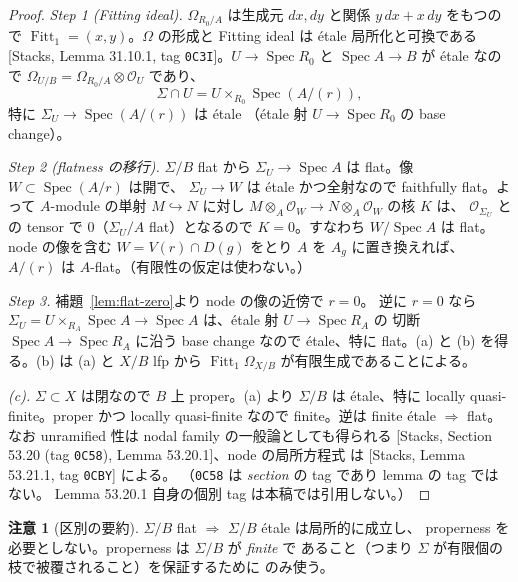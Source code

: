\documentclass[11pt,a4paper]{article}
\numberwithin{equation}{section}
\theoremstyle{definition}
\newtheorem{remark}[definition]{注意}
\DeclareMathOperator{\Fitt}{Fitt}
\newcommand{\OO}{\mathcal O}
\begin{document}
\begin{proof}
\emph{Step 1 (Fitting ideal).} \(\Omega_{R_0/A}\) は生成元 \(dx,dy\) と関係
\(y\,dx+x\,dy\) をもつので \(\Fitt_1=(x,y)\)。\(\Omega\) の形成と Fitting
ideal は étale 局所化と可換である
[Stacks, Lemma 31.10.1, tag \texttt{0C3I}]。\(U\to\operatorname{Spec}R_0\)
と \(\operatorname{Spec}A\to B\) が étale なので
\(\Omega_{U/B}=\Omega_{R_0/A}\otimes\OO_U\) であり、
\[
  \Sigma\cap U=U\times_{R_0}\operatorname{Spec}(A/(r)),
\]
特に \(\Sigma_U\to\operatorname{Spec}(A/(r))\) は étale
（étale 射 \(U\to\operatorname{Spec}R_0\) の base change）。

\emph{Step 2 (flatness の移行).} \(\Sigma/B\) flat から \(\Sigma_U\to
\operatorname{Spec}A\) は flat。像 \(W\subset\operatorname{Spec}(A/r)\) は開で、
\(\Sigma_U\to W\) は étale かつ全射なので faithfully flat。よって
\(A\)-module の単射 \(M\hookrightarrow N\) に対し
\(M\otimes_A\OO_W\to N\otimes_A\OO_W\) の核 \(K\) は、
\(\OO_{\Sigma_U}\) との tensor で \(0\)（\(\Sigma_U/A\) flat）となるので
\(K=0\)。すなわち \(W/\operatorname{Spec}A\) は flat。node の像を含む
\(W=V(r)\cap D(g)\) をとり \(A\) を \(A_g\) に置き換えれば、
\(A/(r)\) は \(A\)-flat。（有限性の仮定は使わない。）

\emph{Step 3.} 補題~\ref{lem:flat-zero}より node の像の近傍で \(r=0\)。
逆に \(r=0\) なら \(\Sigma_U=U\times_{R_A}\operatorname{Spec}A\to
\operatorname{Spec}A\) は、étale 射 \(U\to\operatorname{Spec}R_A\) の
切断 \(\operatorname{Spec}A\to\operatorname{Spec}R_A\) に沿う base change
なので étale、特に flat。(a) と (b) を得る。(b) は (a) と
\(X/B\) lfp から \(\Fitt_1\Omega_{X/B}\) が有限生成であることによる。

\emph{(c).} \(\Sigma\subset X\) は閉なので \(B\) 上 proper。(a) より
\(\Sigma/B\) は étale、特に locally quasi-finite。proper かつ locally
quasi-finite なので finite。逆は finite étale $\Rightarrow$ flat。
なお unramified 性は nodal family の一般論としても得られる
[Stacks, Section 53.20 (tag \texttt{0C58}), Lemma 53.20.1]、node の局所方程式
は [Stacks, Lemma 53.21.1, tag \texttt{0CBY}] による。
（\texttt{0C58} は \emph{section} の tag であり lemma の tag ではない。
Lemma 53.20.1 自身の個別 tag は本稿では引用しない。）
\end{proof}

\begin{remark}[区別の要約]\label{rem:flat-etale-distinction}
\(\Sigma/B\) flat $\Rightarrow$ \(\Sigma/B\) étale は局所的に成立し、
properness を必要としない。properness は \(\Sigma/B\) が \emph{finite} で
あること（つまり $\Sigma$ が有限個の枝で被覆されること）を保証するために
のみ使う。
\end{remark}
\end{document}
